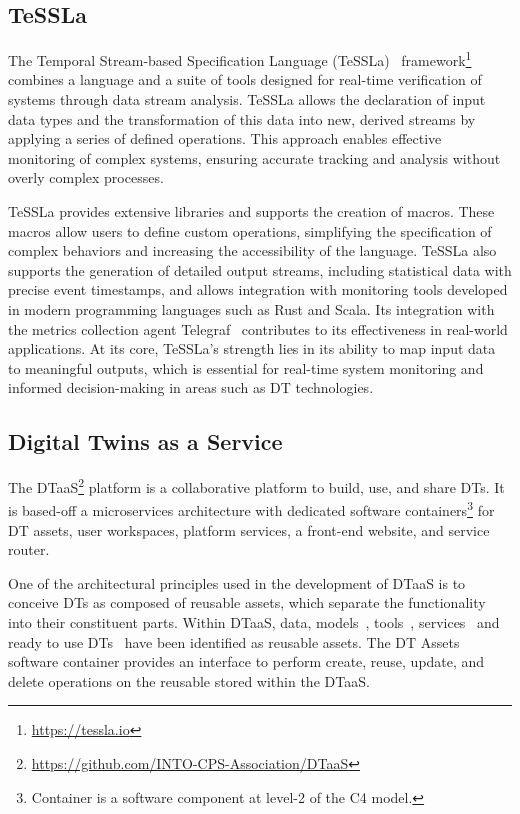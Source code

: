\subsection{TeSSLa}
The Temporal Stream-based Specification Language (TeSSLa)~\cite{convent2018tessla} framework\footnote{\url{https://tessla.io}} combines a language and a suite of tools designed for real-time verification of systems through data stream analysis. TeSSLa allows the declaration of input data types and the transformation of this data into new, derived streams by applying a series of defined operations. This approach enables effective monitoring of complex systems, ensuring accurate tracking and analysis without overly complex processes.

TeSSLa provides extensive libraries and supports the creation of macros. These macros allow users to define custom operations, simplifying the specification of complex behaviors and increasing the accessibility of the language. TeSSLa also supports the generation of detailed output streams, including statistical data with precise event timestamps, and allows integration with monitoring tools developed in modern programming languages such as Rust and Scala. Its integration with the metrics collection agent Telegraf~\cite{TT-Connector} contributes to its effectiveness in real-world applications.
At its core, TeSSLa's strength lies in its ability to map input data to meaningful outputs, which is essential for real-time system monitoring and informed decision-making in areas such as DT technologies.

\subsection{Digital Twins as a Service}
The DTaaS\footnote{\url{https://github.com/INTO-CPS-Association/DTaaS}} platform is a collaborative platform to build, use, and share DTs.
It is based-off a microservices architecture with dedicated software containers\footnote{Container is a software component at level-2 of the C4 model.} for DT assets, user workspaces, platform services, a front-end website, and service router.

One of the architectural principles used in the development of DTaaS is to conceive DTs as composed of reusable assets, which separate the functionality into their constituent parts.
Within DTaaS, data, models~\cite{Zambrano&22}, tools~\cite{qi2021enabling}, services~\cite{budiardjo2021digital,robles2023opentwins} and ready to use DTs~\cite{aziz2023distributed} have been identified as reusable assets.
The DT Assets software container provides an interface to perform create, reuse, update, and delete operations on the reusable stored within the DTaaS.

